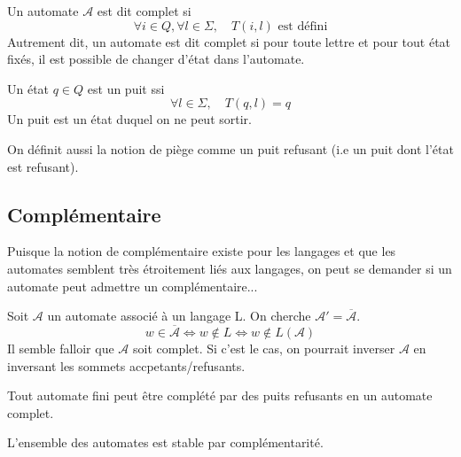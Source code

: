 \begin{definition}
    Un automate $\mathcal{A}$ est dit complet si 
        \[ \forall i \in Q, \forall l \in \Sigma, \quad T(i,l) \text{ est défini} \] 
    Autrement dit, un automate est dit complet si pour toute lettre et pour tout état fixés, il est possible de 
    changer d'état dans l'automate.  
\end{definition} 

\begin{definition}[Puit]
    Un état $q \in Q$ est un puit ssi 
        \[ \forall l \in \Sigma, \quad T(q,l) = q \]
    Un puit est un état duquel on ne peut sortir. 
\end{definition}

On définit aussi la notion de piège comme un puit refusant (i.e un puit dont l'état est refusant). 

\subsection{Complémentaire}

Puisque la notion de complémentaire existe pour les langages et que les automates semblent très étroitement liés 
aux langages, on peut se demander si un automate peut admettre un complémentaire... 

Soit $\mathcal{A}$ un automate associé à un langage L. On cherche $\mathcal{A}' = \overline{\mathcal{A}}$. 
    \[ w \in \overline{\mathcal{A}} \iff w \not \in L \iff w \not \in L(\mathcal{A}) \] 
Il semble falloir que $\mathcal{A}$ soit complet. Si c'est le cas, on pourrait inverser $\mathcal{A}$ en inversant 
les sommets accpetants/refusants. 

\begin{proposition}
    Tout automate fini peut être complété par des puits refusants en un automate complet. 
\end{proposition}

\begin{theorem}[Complémentarité]
    L'ensemble des automates est stable par complémentarité. 
\end{theorem}


